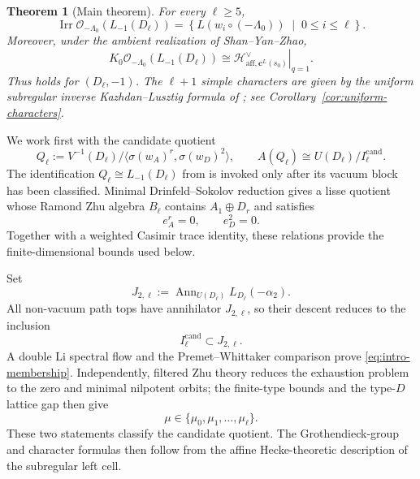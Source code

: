 \documentclass[11pt]{amsart}
\newtheorem{theorem}{Theorem}[section]
\theoremstyle{remark}
\numberwithin{equation}{section}
\begin{document}
\begin{theorem}[Main theorem]
For every \(\ell\ge5\),
\begin{equation}
   \operatorname{Irr}\mathcal O_{-\Lambda_0}
   \!\left(L_{-1}(D_\ell)\right)
   =
   \left\{
      L\!\left(w_i\circ(-\Lambda_0)\right)
      \;\middle|\;0\le i\le\ell
   \right\}.
\end{equation}
Moreover, under the ambient realization of Shan--Yan--Zhao,
\begin{equation}
   K_0\mathcal O_{-\Lambda_0}\!\left(L_{-1}(D_\ell)\right)
   \cong
   \left.
      \mathcal H^\vee_{\mathrm{aff},\mathbf c^L(s_0)}
   \right|_{q=1}.
\end{equation}
Thus \cite[Conjecture~5.2.1]{ShanYanZhao2026} holds for
\((D_\ell,-1)\).  The \(\ell+1\) simple characters are given by the uniform
subregular inverse Kazhdan--Lusztig formula of
\cite{BezrukavnikovKacKrylov2024}; see Corollary~\ref{cor:uniform-characters}.
\end{theorem}

We work first with the candidate quotient
\[
   Q_\ell
   :=V^{-1}(D_\ell)/\langle\sigma(w_A)^r,\sigma(w_D)^2\rangle,
   \qquad
   A(Q_\ell)\cong U(D_\ell)/I_\ell^{\mathrm{cand}}.
\]
The identification \(Q_\ell\cong L_{-1}(D_\ell)\) from \cite{Jin2026}
is invoked only after its vacuum block has been classified.
Minimal Drinfeld--Sokolov reduction gives a lisse quotient whose Ramond Zhu
algebra \(B_\ell\) contains \(A_1\oplus D_r\) and satisfies
\begin{equation}
\label{eq:intro-nilpotence}
   e_A^r=0,\qquad e_D^2=0.
\end{equation}
Together with a weighted Casimir trace identity, these relations provide the
finite-dimensional bounds used below.

Set
\[
   J_{2,\ell}:=
   \operatorname{Ann}_{U(D_\ell)}L_{D_\ell}(-\alpha_2).
\]
All non-vacuum path tops have annihilator \(J_{2,\ell}\), so their descent
reduces to the inclusion
\begin{equation}
\label{eq:intro-membership}
   I_\ell^{\mathrm{cand}}\subset J_{2,\ell}.
\end{equation}
A double Li spectral flow and the Premet--Whittaker comparison prove
\eqref{eq:intro-membership}.  Independently, filtered Zhu theory reduces the
exhaustion problem to the zero and minimal nilpotent orbits; the finite-type
bounds and the type-\(D\) lattice gap then give
\begin{equation}
\label{eq:intro-exhaustion}
   \mu\in\{\mu_0,\mu_1,\ldots,\mu_\ell\}.
\end{equation}
These two statements classify the candidate quotient.  The
Grothendieck-group and character formulas then follow from the affine
Hecke-theoretic description of the subregular left cell.
\end{document}
